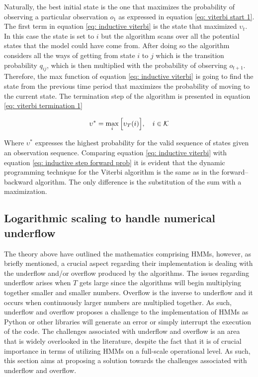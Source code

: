 Naturally, the best initial state is the one that maximizes the probability of observing a particular observation $o_1$ as expressed in equation \ref{eq: viterbi start 1}. The first term in equation \ref{eq: inductive viterbi} is the state that maximized $\upsilon_t$. In this case the state is set to $i$ but the algorithm scans over all the potential states that the model could have come from. After doing so the algorithm considers all the ways of getting from state  $i$ to $j$ which is the transition probability $q_{ij}$, which is then multiplied with the probability of observing $o_{t+1}$. Therefore, the max function of equation \ref{eq: inductive viterbi} is going to find the state from the previous time period that maximizes the probability of moving to the current state. The termination step of the algorithm is presented in equation \ref{eq: viterbi termination 1} 

\begin{equation}
    \upsilon^* = \max_{i}\Big[\upsilon_T(i)\Big],
    \quad i \in\operatorname{\mathcal{K}}
    \label{eq: viterbi termination 1}
\end{equation}

Where $\upsilon^*$ expresses the highest probability for the valid sequence of states given an observation sequence. Comparing equation \ref{eq: inductive viterbi} with equation \ref{eq: inductive step forward prob} it is evident that the dynamic programming technique for the Viterbi algorithm is the same as in the forward–backward
algorithm. The only difference is the substitution of the sum with a maximization.

\subsection{Logarithmic scaling to handle numerical underflow}
\label{subsection: log scalling underflow}

The theory above have outlined the mathematics comprising HMMs, however, as briefly mentioned, a crucial aspect regarding their implementation is dealing with the underflow and/or overflow produced by the algorithms. The issues regarding underflow arises when $T$ gets large since the algorithms will begin multiplying together smaller and smaller numbers. Overflow is the inverse to underflow and it occurs when continuously larger numbers are multiplied together. As such, underflow and overflow proposes a challenge to the implementation of HMMs as Python or other libraries will generate an error or simply interrupt the execution of the code. The challenges associated with underflow and overflow is an area that is widely overlooked in the literature, despite the fact that it is of crucial importance in terms of utilizing HMMs on a full-scale operational level. As such, this section aims at proposing a solution towards the challenges associated with underflow and overflow.

